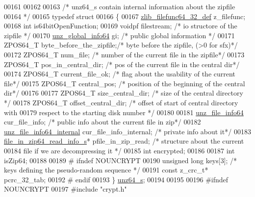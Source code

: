 \begin{DoxyCode}
00161 
00162 
00163 \textcolor{comment}{/* unz64\_s contain internal information about the zipfile}
00164 \textcolor{comment}{*/}
00165 \textcolor{keyword}{typedef} \textcolor{keyword}{struct}
00166 \{
00167     \hyperlink{structzlib__filefunc64__32__def__s}{zlib\_filefunc64\_32\_def} z\_filefunc;
00168     \textcolor{keywordtype}{int} is64bitOpenFunction;
00169     voidpf filestream;        \textcolor{comment}{/* io structore of the zipfile */}
00170     \hyperlink{structunz__global__info64__s}{unz\_global\_info64} gi;       \textcolor{comment}{/* public global information */}
00171     ZPOS64\_T byte\_before\_the\_zipfile;\textcolor{comment}{/* byte before the zipfile, (>0 for sfx)*/}
00172     ZPOS64\_T num\_file;             \textcolor{comment}{/* number of the current file in the zipfile*/}
00173     ZPOS64\_T pos\_in\_central\_dir;   \textcolor{comment}{/* pos of the current file in the central dir*/}
00174     ZPOS64\_T current\_file\_ok;      \textcolor{comment}{/* flag about the usability of the current file*/}
00175     ZPOS64\_T central\_pos;          \textcolor{comment}{/* position of the beginning of the central dir*/}
00176 
00177     ZPOS64\_T size\_central\_dir;     \textcolor{comment}{/* size of the central directory  */}
00178     ZPOS64\_T offset\_central\_dir;   \textcolor{comment}{/* offset of start of central directory with}
00179 \textcolor{comment}{                                   respect to the starting disk number */}
00180 
00181     \hyperlink{structunz__file__info64__s}{unz\_file\_info64} cur\_file\_info; \textcolor{comment}{/* public info about the current file in zip*/}
00182     \hyperlink{structunz__file__info64__internal__s}{unz\_file\_info64\_internal} cur\_file\_info\_internal; \textcolor{comment}{/* private info about it*/}
00183     \hyperlink{structfile__in__zip64__read__info__s}{file\_in\_zip64\_read\_info\_s}* pfile\_in\_zip\_read; \textcolor{comment}{/* structure about the current}
00184 \textcolor{comment}{                                        file if we are decompressing it */}
00185     \textcolor{keywordtype}{int} encrypted;
00186 
00187     \textcolor{keywordtype}{int} isZip64;
00188 
00189 \textcolor{preprocessor}{#    ifndef NOUNCRYPT}
00190     \textcolor{keywordtype}{unsigned} \textcolor{keywordtype}{long} keys[3];     \textcolor{comment}{/* keys defining the pseudo-random sequence */}
00191     \textcolor{keyword}{const} z\_crc\_t* pcrc\_32\_tab;
00192 \textcolor{preprocessor}{#    endif}
00193 \} \hyperlink{structunz64__s}{unz64\_s};
00194 
00195 
00196 \textcolor{preprocessor}{#ifndef NOUNCRYPT}
00197 \textcolor{preprocessor}{#include "crypt.h"}

\end{DoxyCode}
